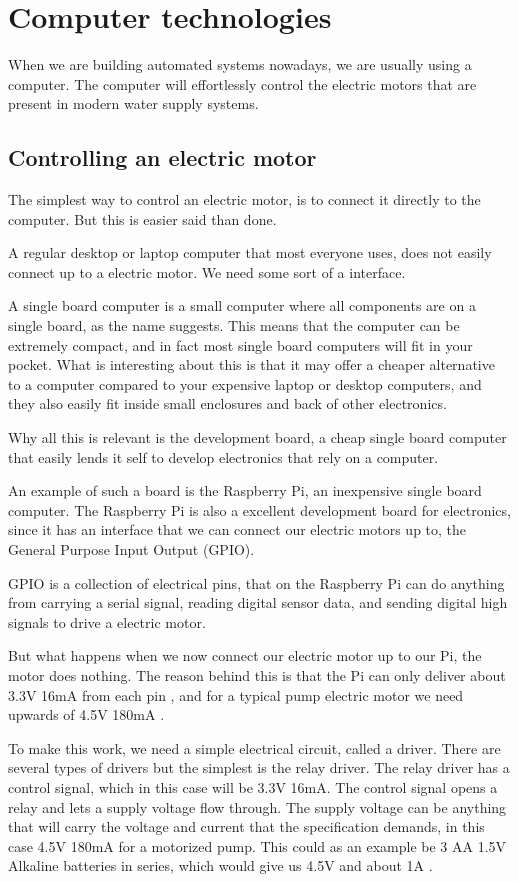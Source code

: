 \documentclass[a4paper,12pt,twoside,openright,titlepage]{book}
\begin{document}
\section{Computer technologies}
When we are building automated systems nowadays, we are usually using a computer.
The computer will effortlessly control the electric motors that are present in modern water supply systems.

\subsection{Controlling an electric motor}
The simplest way to control an electric motor, is to connect it directly to the computer. But this is easier said than done.

A regular desktop or laptop computer that most everyone uses, does not easily connect up to a electric motor. We need some sort of a interface.

A single board computer is a small computer where all components are on a single board, as the name suggests.
This means that the computer can be extremely compact, and in fact most single board computers will fit in your pocket.
What is interesting about this is that it may offer a cheaper alternative to a computer compared to your expensive laptop or desktop computers, and they also easily fit inside small enclosures and back of other electronics.

Why all this is relevant is the development board, a cheap single board computer that easily lends it self to develop electronics that rely on a computer.

An example of such a board is the Raspberry Pi, an inexpensive single board computer.
The Raspberry Pi is also a excellent development board for electronics, since it has an interface that we can connect our electric motors up to, the General Purpose Input Output (GPIO).

GPIO is a collection of electrical pins, that on the Raspberry Pi can do anything from carrying a serial signal, reading digital sensor data, and sending digital high signals to drive a electric motor.

But what happens when we now connect our electric motor up to our Pi, the motor does nothing.
The reason behind this is that the Pi can only deliver about 3.3V 16mA from each pin \cite{pi_pin_current}, and for a typical pump electric motor we need upwards of 4.5V 180mA \cite{aliexpress_pump}.

To make this work, we need a simple electrical circuit, called a driver. There are several types of drivers but the simplest is the relay driver.
The relay driver has a control signal, which in this case will be 3.3V 16mA.
The control signal opens a relay and lets a supply voltage flow through.
The supply voltage can be anything that will carry the voltage and current that the specification demands, in this case 4.5V 180mA for a motorized pump. This could as an example be 3 AA 1.5V Alkaline batteries in series, which would give us 4.5V and about 1A \cite{battery_current}.
\end{document}
